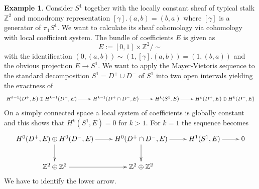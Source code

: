 \documentclass[10pt]{amsart}
\theoremstyle{definition}
\newtheorem{ex}[defn]{Example}
\theoremstyle{plain}
\theoremstyle{remark}
\newcommand{\Z}{\mathbb{Z}}
\newcommand{\union}{\cup}
\newcommand{\intersection}{\cap}
\begin{document}
\begin{ex}\label{twistarsch}
Consider $S^1$ together with the locally constant sheaf of typical stalk $\Z^2$ and monodromy representation $[\gamma].(a,b)=(b,a)$ where $[\gamma]$ is a generator of $\pi_1S^1$. We want to calculate its sheaf cohomology via cohomology with local coefficient system. The bundle of coefficients $E$ is given as $$E:=[0,1]\times\Z^2/\sim$$ with the identification $(0,(a,b))\sim (1,[\gamma].(a,b))=(1,(b,a))$ and the obvious projection $E\to S^1$. We want to apply the Mayer-Vietoris sequence to the standard decomposition $S^1=D^+\union D^-$ of $S^1$ into two open intervals yielding the exactness of
\[\begin{xy}
  \xymatrix{
  H^{k-1}(D^+,E)\oplus H^{k-1}(D^-,E)\ar[r] & H^{k-1}(D^+\intersection D^-,E)\ar[r] & H^k(S^1,E)\ar[r] & H^k(D^+,E)\oplus H^k(D^-,E)
  } 
  \end{xy}\]
On a simply connected space a local system of coefficients is globally constant and this shows that $H^k(S^1,E)=0$ for $k>1$. For $k=1$ the sequence becomes
\begin{align}\label{arsch}
\begin{xy}
  \xymatrix{
  H^0(D^+,E)\oplus H^0(D^-,E)\ar[r]\ar[d] & H^0(D^+\intersection D^-,E)\ar[r]\ar[d] & H^1(S^1,E)\ar[r] & 0\\
  \Z^2\oplus\Z^2\ar[r] & \Z^2\oplus\Z^2 & & 
  }
  \end{xy}
\end{align}
We have to identify the lower arrow.\newline
{}
\end{ex}
\end{document}
